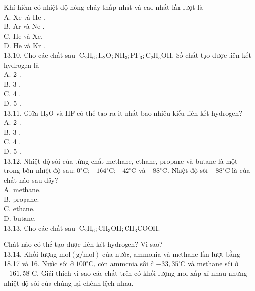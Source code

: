 \documentclass[10pt]{article}
\begin{document}
Khí hiếm có nhiệt độ nóng chảy thấp nhất và cao nhất lần lượt là\\
A. Xe và He .\\
B. Ar và Ne .\\
C. He và Xe.\\
D. He và Kr .\\
13.10. Cho các chất sau: $\mathrm{C}_{2} \mathrm{H}_{6} ; \mathrm{H}_{2} \mathrm{O} ; \mathrm{NH}_{3} ; \mathrm{PF}_{3} ; \mathrm{C}_{2} \mathrm{H}_{5} \mathrm{OH}$. Số chất tạo được liên kết hydrogen là\\
A. 2 .\\
B. 3 .\\
C. 4 .\\
D. 5 .\\
13.11. Giữa $\mathrm{H}_{2} \mathrm{O}$ và HF có thể tạo ra it nhất bao nhiêu kiểu liên kết hydrogen?\\
A. 2 .\\
B. 3 .\\
C. 4 .\\
D. 5 .\\
13.12. Nhiệt độ sôi của từng chất methane, ethane, propane và butane là một trong bốn nhiệt độ sau: $0^{\circ} \mathrm{C} ;-164^{\circ} \mathrm{C} ;-42^{\circ} \mathrm{C}$ và $-88^{\circ} \mathrm{C}$. Nhiệt độ sôi $-88^{\circ} \mathrm{C}$ là của chất nào sau đây?\\
A. methane.\\
B. propane.\\
C. ethane.\\
D. butane.\\
13.13. Cho các chất sau: $\mathrm{C}_{2} \mathrm{H}_{6} ; \mathrm{CH}_{3} \mathrm{OH} ; \mathrm{CH}_{3} \mathrm{COOH}$.

Chất nào có thể tạo được liên kết hydrogen? Vì sao?\\
13.14. Khối lượng $\mathrm{mol}(\mathrm{g} / \mathrm{mol})$ của nước, ammonia và methane lần lượt bằng 18,17 và 16. Nước sôi ở $100^{\circ} \mathrm{C}$, còn ammonia sôi ở $-33,35^{\circ} \mathrm{C}$ và methane sôi ở $-161,58^{\circ} \mathrm{C}$. Giải thích vì sao các chất trên có khối lượng mol xấp xỉ nhau nhưng nhiệt độ sôi của chúng lại chênh lệch nhau.
\end{document}
